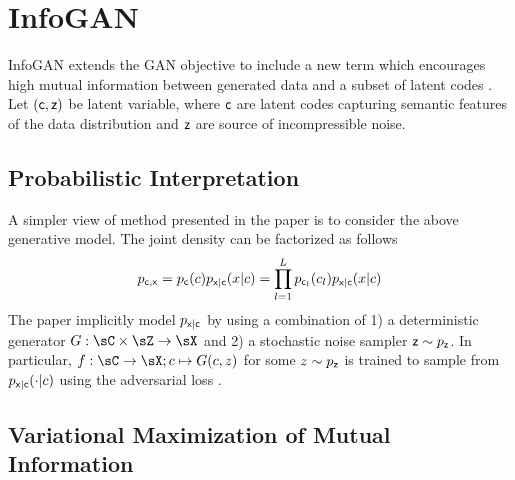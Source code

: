 \documentclass[11pt]{article}
\begin{document}
 


\section{InfoGAN}

InfoGAN extends the GAN objective to include a new term which encourages high mutual information between generated data and a subset of latent codes \cite{chenInfoGANInterpretableRepresentation2016}. Let $(\mathsf{c},\mathsf{z})$ be latent variable, where $\mathsf{c}$ are latent codes capturing semantic features of the data distribution and $\mathsf{z}$ are source of incompressible noise.

\subsection{Probabilistic Interpretation}

A simpler view of method presented in the paper is to consider the above generative model. The joint density can be factorized as follows
\[
    p_{\mathsf{c},\mathsf{x}} = p_{\mathsf{c}}(c) p_{\mathsf{x}|\mathsf{c}}(x|c) = \prod_{l=1}^L p_{\mathsf{c}_l}(c_l) p_{\mathsf{x}|\mathsf{c}}(x|c)
\]
The paper implicitly model $p_{\mathsf{x}|\mathsf{c}}$ by using a combination of 1) a deterministic generator $G:\sC\times\sZ\to\sX$ and 2) a stochastic noise sampler $\mathsf{z} \sim p_{\mathsf{z}}$. In particular, $f:\sC\to \sX; c \mapsto G(c,z)$ for some $z\sim p_{\mathsf{z}}$ is trained to sample from $p_{\mathsf{x}|\mathsf{c}}(\cdot|c)$ using the adversarial loss \cite{goodfellowGenerativeAdversarialNetworks2014}.

\subsection{Variational Maximization of Mutual Information}
\end{document}
